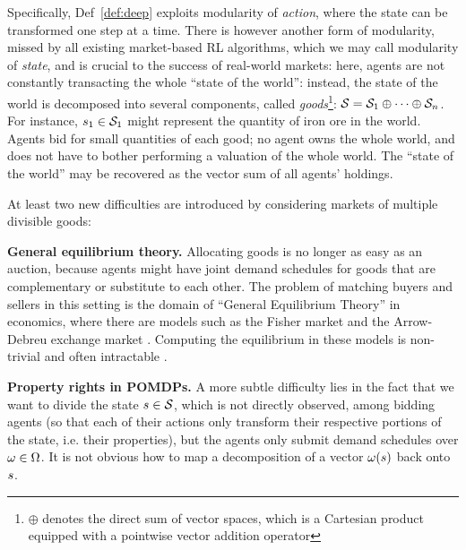 Specifically, Def~\ref{def:deep} exploits modularity of \emph{action}, where the state can be transformed one step at a time. There is however another form of modularity, missed by all existing market-based RL algorithms, which we may call modularity of \emph{state}, and is crucial to the success of real-world markets:  here, agents are not constantly transacting the whole ``state of the world'': instead, the state of the world is decomposed into several components, called \emph{goods}\footnote{$\oplus$ denotes the direct sum of vector spaces, which is a Cartesian product equipped with a pointwise vector addition operator}: $\mathcal{S}=\mathcal{S}_1\oplus\dots\oplus\mathcal{S}_n$. For instance, $s_1\in\mathcal{S}_1$ might represent the quantity of iron ore in the world. Agents bid for small quantities of each good; no agent owns the whole world, and does not have to bother performing a valuation of the whole world. The ``state of the world'' may be recovered as the vector sum of all agents' holdings.%


At least two new difficulties are introduced by considering markets of multiple divisible goods:

\textbf{General equilibrium theory.} Allocating goods is no longer as easy as an auction, because agents might have joint demand schedules for goods that are complementary or substitute to each other. The problem of matching buyers and sellers in this setting is the domain of ``General Equilibrium Theory'' in economics, where there are models such as the Fisher market and the Arrow-Debreu exchange market \cite{arrowExistenceEquilibriumCompetitive1954, mckenzieExistenceGeneralEquilibrium1959}. Computing the equilibrium in these models is non-trivial and often intractable \cite{chenSettlingComplexityArrowDebreu2009, chenSpendingNotEasier2009a}.

\textbf{Property rights in POMDPs.} A more subtle difficulty lies in the fact that we want to divide the state $s\in\mathcal{S}$, which is not directly observed, among bidding agents (so that each of their actions only transform their respective portions of the state, i.e. their properties), but the agents only submit demand schedules over $\omega\in\Omega$. It is not obvious how to map a decomposition of a vector $\omega(s)$ back onto $s$.

